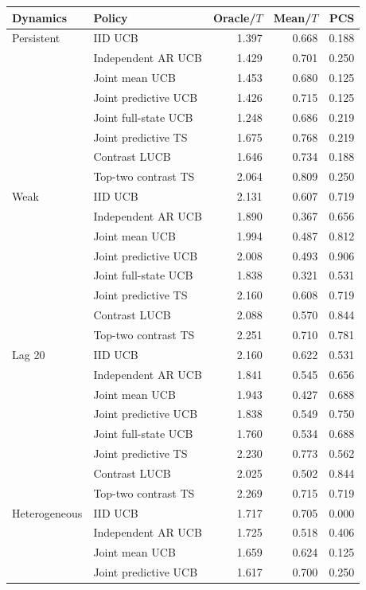 \begin{tabular}{llrrr}
\toprule
Dynamics & Policy & Oracle/$T$ & Mean/$T$ & PCS\\
\midrule
Persistent & IID UCB & 1.397 & 0.668 & 0.188\\
 & Independent AR UCB & 1.429 & 0.701 & 0.250\\
 & Joint mean UCB & 1.453 & 0.680 & 0.125\\
 & Joint predictive UCB & 1.426 & 0.715 & 0.125\\
 & Joint full-state UCB & 1.248 & 0.686 & 0.219\\
 & Joint predictive TS & 1.675 & 0.768 & 0.219\\
 & Contrast LUCB & 1.646 & 0.734 & 0.188\\
 & Top-two contrast TS & 2.064 & 0.809 & 0.250\\
\midrule
Weak & IID UCB & 2.131 & 0.607 & 0.719\\
 & Independent AR UCB & 1.890 & 0.367 & 0.656\\
 & Joint mean UCB & 1.994 & 0.487 & 0.812\\
 & Joint predictive UCB & 2.008 & 0.493 & 0.906\\
 & Joint full-state UCB & 1.838 & 0.321 & 0.531\\
 & Joint predictive TS & 2.160 & 0.608 & 0.719\\
 & Contrast LUCB & 2.088 & 0.570 & 0.844\\
 & Top-two contrast TS & 2.251 & 0.710 & 0.781\\
\midrule
Lag 20 & IID UCB & 2.160 & 0.622 & 0.531\\
 & Independent AR UCB & 1.841 & 0.545 & 0.656\\
 & Joint mean UCB & 1.943 & 0.427 & 0.688\\
 & Joint predictive UCB & 1.838 & 0.549 & 0.750\\
 & Joint full-state UCB & 1.760 & 0.534 & 0.688\\
 & Joint predictive TS & 2.230 & 0.773 & 0.562\\
 & Contrast LUCB & 2.025 & 0.502 & 0.844\\
 & Top-two contrast TS & 2.269 & 0.715 & 0.719\\
\midrule
Heterogeneous & IID UCB & 1.717 & 0.705 & 0.000\\
 & Independent AR UCB & 1.725 & 0.518 & 0.406\\
 & Joint mean UCB & 1.659 & 0.624 & 0.125\\
 & Joint predictive UCB & 1.617 & 0.700 & 0.250\\

\end{tabular}
